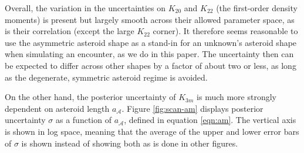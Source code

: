 \documentclass[fleqn,usenatbib]{mnras}
\begin{document}
Overall, the variation in the uncertainties on $K_{20}$ and $K_{22}$ (the first-order density moments) is present but largely smooth across their allowed parameter space, as is their correlation (except the large $K_{22}$ corner). It therefore seems reasonable to use the asymmetric asteroid shape as a stand-in for an unknown's asteroid shape when simulating an encounter, as we do in this paper. The uncertainty then can be expected to differ across other shapes by a factor of about two or less, as long as the degenerate, symmetric asteroid regime is avoided.

On the other hand, the posterior uncertainty of $K_{3m}$ is much more strongly dependent on asteroid length $a_\mathcal{A}$. Figure \ref{fig:scan-am} displays posterior uncertainty $\sigma$ as a function of $a_\mathcal{A}$, defined in equation \ref{eqn:am}. The vertical axis is shown in log space, meaning that the average of the upper and lower error bars of $\sigma$ is shown instead of showing both as is done in other figures.
\end{document}
